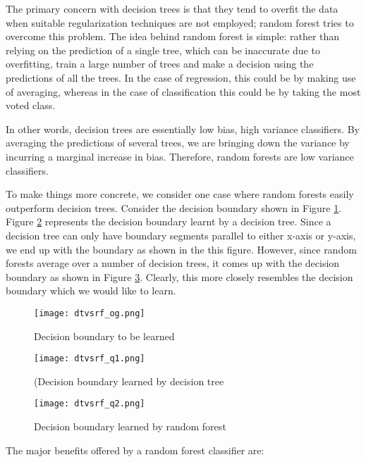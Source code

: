 \documentclass[conference]{IEEEtran}
\begin{document}
The primary concern with decision trees is that they tend to overfit the data when suitable regularization techniques are not employed; random forest tries to overcome this problem. The idea behind random forest is simple: rather than relying on the prediction of a single tree, which can be inaccurate due to overfitting, train a large number of trees and make a decision using the predictions of all the trees. In the case of regression, this could be by making use of averaging, whereas in the case of classification this could be by taking the most voted class.

In other words, decision trees are essentially low bias, high variance classifiers. By averaging the predictions of several trees, we are bringing down the variance by incurring a marginal increase in bias. Therefore, random forests are low variance classifiers.  

To make things more concrete, we consider one case where random forests easily outperform decision trees. Consider the decision boundary shown in Figure \ref{dtvsrf_og}. Figure \ref{dtvsrf_q1} represents the decision boundary learnt by a decision tree. Since a decision tree can only have boundary segments parallel to either x-axis or y-axis, we end up with the boundary as shown in the this figure. However, since random forests average over a number of decision trees, it comes up with the decision boundary as shown in Figure \ref{dtvsrf_q2}. Clearly, this more closely resembles the decision boundary which we would like to learn.

\begin{figure}[tbh]
\centering
\texttt{[image: dtvsrf\_og.png]}
\caption{Decision boundary to be learned}
\label{dtvsrf_og}
\end{figure}

\begin{figure}[tbh]
\centering
\texttt{[image: dtvsrf\_q1.png]}
\caption{(Decision boundary learned by decision tree }
\label{dtvsrf_q1}
\end{figure}

\begin{figure}[tbh]
\centering
\texttt{[image: dtvsrf\_q2.png]}
\caption{Decision boundary learned by random forest}
\label{dtvsrf_q2}
\end{figure}

The major benefits offered by a random forest classifier are:
\end{document}
